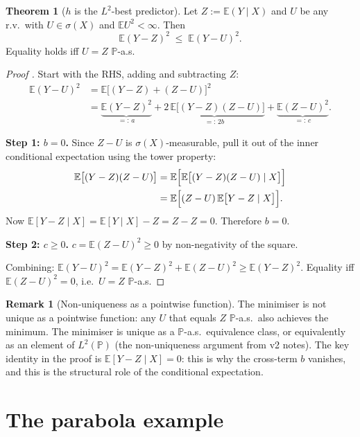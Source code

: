 \documentclass[12pt, a4paper]{article}
\theoremstyle{definition}
\newtheorem{theorem}{Theorem}[section]
\newtheorem{remark}{Remark}[section]
\newcommand{\E}{\mathbb{E}}
\newcommand{\Prob}{\mathbb{P}}
\begin{document}
\begin{theorem}[$h$ is the $L^2$-best predictor]\label{thm:l2opt}
Let $Z:=\E(Y\mid X)$ and $U$ be any r.v.\ with
$U\in\sigma(X)$ and $\E U^2<\infty$.  Then
\[
  \E(Y-Z)^2 \;\leq\; \E(Y-U)^2.
\]
Equality holds iff $U=Z$ $\Prob$-a.s.
\end{theorem}

\begin{proof}[Proof ]
Start with the RHS, adding and subtracting $Z$:
\begin{align*}
  \E(Y-U)^2
  &= \E\bigl[(Y-Z)+(Z-U)\bigr]^2 \\
  &= \underbrace{\E(Y-Z)^2}_{=:\,a}
   + \underbrace{2\,\E\bigl[(Y-Z)(Z-U)\bigr]}_{=:\,2b}
   + \underbrace{\E(Z-U)^2}_{=:\,c}.
\end{align*}

\textbf{Step 1: $b=0$.}
Since $Z-U$ is $\sigma(X)$-measurable, pull it out of the
inner conditional expectation using the tower property:
\begin{align*}
  \E\bigl[(Y-Z)(Z-U)\bigr]
  &= \E\Bigl[\E\bigl[(Y-Z)(Z-U)\mid X\bigr]\Bigr] \\
  &= \E\Bigl[(Z-U)\,\E\bigl[Y-Z\mid X\bigr]\Bigr].
\end{align*}
Now $\E[Y-Z\mid X]=\E[Y\mid X]-Z=Z-Z=0$.
Therefore $b=0$.

\textbf{Step 2: $c\geq 0$.}
$c=\E(Z-U)^2\geq 0$ by non-negativity of the square.

Combining: $\E(Y-U)^2=\E(Y-Z)^2+\E(Z-U)^2\geq\E(Y-Z)^2$.
Equality iff $\E(Z-U)^2=0$, i.e.\ $U=Z$ $\Prob$-a.s.
\end{proof}

\begin{remark}[Non-uniqueness as a pointwise function]
The minimiser is not unique as a pointwise function: any
$U$ that equals $Z$ $\Prob$-a.s.\ also achieves the minimum.
The minimiser is unique as a $\Prob$-a.s.\ equivalence class,
or equivalently as an element of $L^2(\Prob)$ (the non-uniqueness argument
from v2 notes).
The key identity in the proof is $\E[Y-Z\mid X]=0$:
this is why the cross-term $b$ vanishes, and this is the
structural role of the conditional expectation.
\end{remark}

\section{The parabola example}
\label{sec:parabola}
\end{document}
